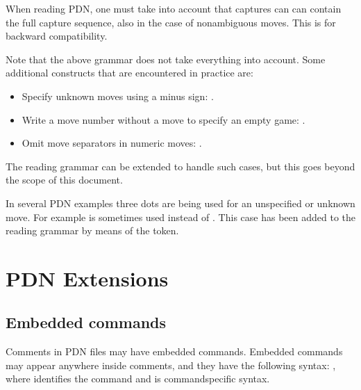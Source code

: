 \documentclass[letterpaper,10pt,english]{sphinxmanual}
\begin{document}
\sphinxAtStartPar
When reading PDN, one must take into account that captures can can contain the full capture sequence,
also in the case of non\sphinxhyphen{}ambiguous moves. This is for backward compatibility.

\sphinxAtStartPar
Note that the above  grammar does not take everything into account. Some additional
constructs that are encountered in practice are:
\begin{itemize}
\item {} 
\sphinxAtStartPar
Specify unknown moves using a minus sign: .

\item {} 
\sphinxAtStartPar
Write a move number without a move to specify an empty game: .

\item {} 
\sphinxAtStartPar
Omit move separators in numeric moves: .

\end{itemize}

\sphinxAtStartPar
The reading grammar can be extended to handle such cases, but this goes beyond the
scope of this document.

\sphinxAtStartPar
In several PDN examples three dots are being used for an unspecified or unknown move.
For example  is sometimes used instead of . This case has
been added to the reading grammar by means of the  token.

\sphinxstepscope


\chapter{PDN Extensions}
\label{\detokenize{extensions:pdn-extensions}}\label{\detokenize{extensions:extensions-section}}\label{\detokenize{extensions::doc}}

\section{Embedded commands}
\label{\detokenize{extensions:embedded-commands}}
\sphinxAtStartPar
Comments in PDN files may have embedded commands. Embedded
commands may appear anywhere inside comments, and they have the
following syntax: , where  identifies
the command and  is command\sphinxhyphen{}specific syntax.
\end{document}
